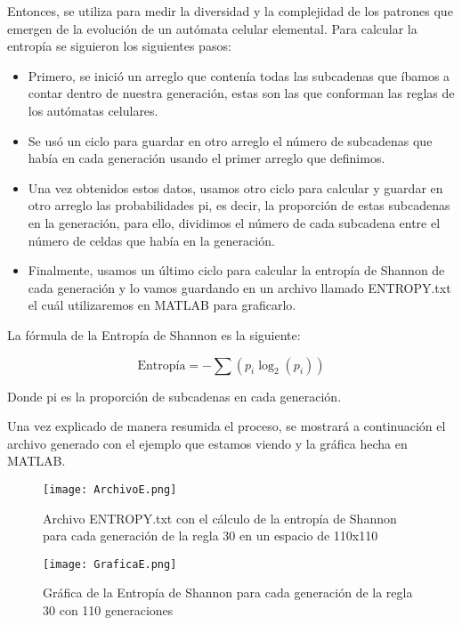 \documentclass{article}
\begin{document}
	Entonces, se utiliza para medir la diversidad y la complejidad de los patrones que emergen de la evolución de un autómata celular elemental. Para calcular la entropía se siguieron los siguientes pasos:
	
	\begin{itemize}
	
	\item Primero, se inició un arreglo que contenía todas las subcadenas que íbamos a contar dentro de nuestra generación, estas son las que conforman las reglas de los autómatas celulares. 
	
	\item Se usó un ciclo para guardar en otro arreglo el número de subcadenas que había en cada generación usando el primer arreglo que definimos. 
	
	\item Una vez obtenidos estos datos, usamos otro ciclo para calcular y guardar en otro arreglo las probabilidades pi, es decir, la proporción de estas subcadenas en la generación, para ello, dividimos el número de cada subcadena entre el número de celdas que había en la generación. 
	
	\item Finalmente, usamos un último ciclo para calcular la entropía de Shannon de cada generación y lo vamos guardando en un archivo llamado ENTROPY.txt el cuál utilizaremos en MATLAB para graficarlo. 
		
	\end{itemize}
	
	La fórmula de la Entropía de Shannon es la siguiente: 
	
	\[
	\text{Entropía} = -\sum (p_i \log_2(p_i))
	\]
	
	Donde pi es la proporción de subcadenas en cada generación.
	
	Una vez explicado de manera resumida el proceso, se mostrará a continuación el archivo generado con el ejemplo que estamos viendo y la gráfica hecha en MATLAB. 
	
	\begin{figure}[h]
		\centering       
		\texttt{[image: ArchivoE.png]}
		\caption{Archivo ENTROPY.txt con el cálculo de la entropía de Shannon para cada generación de la regla 30 en un espacio de 110x110}
		\label{fig:mi_imagen1}
	\end{figure}
	\vspace{300pt}
	\begin{figure}[h]
		\centering       
		\texttt{[image: GraficaE.png]}
		\caption{Gráfica de la Entropía de Shannon para cada generación de la regla 30 con 110 generaciones}
		\label{fig:mi_imagen1}
	\end{figure}
	
\end{document}
